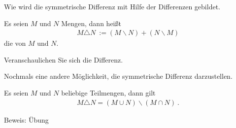 \begin{Unit}
Wie wird die symmetrische Differenz mit Hilfe der Differenzen gebildet.

\begin{Definition}
  Es seien $M$ und $N$ Mengen, dann heißt
  \begin{align}
    M  \triangle N\ := (M \backslash N) + (N \backslash M) 
  \end{align}
  die  
  von $M$ und $N$.
\end{Definition}
Veranschaulichen Sie sich die Differenz.
\end{Unit}

\begin{Unit}[Bemerkung]
Nochmals eine andere Möglichkeit, die symmetrische Differenz darzustellen.

\begin{Bemerkung} 
  Es seien $M$ und $N$ beliebige Teilmengen, dann gilt 
  \begin{align}
    M \triangle N = (M \cup N) \backslash (M \cap N) \ .
  \end{align}
\end{Bemerkung}
Beweis: Übung
\end{Unit}


